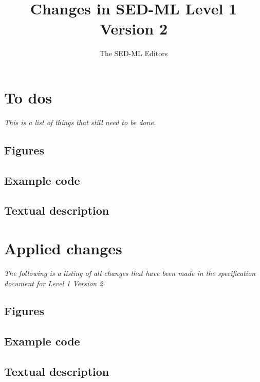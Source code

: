 \documentclass{article}
\begin{document}
\title{Changes in SED-ML Level 1 Version 2}
\author{The SED-ML Editors}

\maketitle


\section{To dos}
\emph{This is a list of things that still need to be done.}

\subsection{Figures}

\subsection{Example code}

\subsection{Textual description}

\section{Applied changes}
\emph{The following is a listing of all changes that have been made in the specification document for Level 1 Version 2.}

\subsection{Figures}

\subsection{Example code}

\subsection{Textual description}
\end{document}
